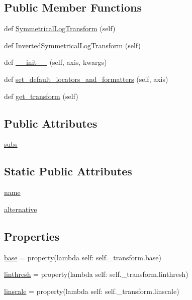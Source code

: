 \subsection*{Public Member Functions}
\begin{DoxyCompactItemize}
\item 
def \hyperlink{classmatplotlib_1_1scale_1_1SymmetricalLogScale_afa44ada0aae6492ca54a109f1097f671}{Symmetrical\+Log\+Transform} (self)
\item 
def \hyperlink{classmatplotlib_1_1scale_1_1SymmetricalLogScale_a5fdfaee038d2ec9296b96859548d03b4}{Inverted\+Symmetrical\+Log\+Transform} (self)
\item 
def \hyperlink{classmatplotlib_1_1scale_1_1SymmetricalLogScale_ae6113677e06d8b69276f1ca89d837b42}{\+\_\+\+\_\+init\+\_\+\+\_\+} (self, axis, kwargs)
\item 
def \hyperlink{classmatplotlib_1_1scale_1_1SymmetricalLogScale_aa6739f407d8e9147c94fcb43a613bba4}{set\+\_\+default\+\_\+locators\+\_\+and\+\_\+formatters} (self, axis)
\item 
def \hyperlink{classmatplotlib_1_1scale_1_1SymmetricalLogScale_ab3f3ccb4ce913cc50d9818ff90bde49d}{get\+\_\+transform} (self)
\end{DoxyCompactItemize}
\subsection*{Public Attributes}
\begin{DoxyCompactItemize}
\item 
\hyperlink{classmatplotlib_1_1scale_1_1SymmetricalLogScale_aebf71a90f042b7902d7d1578bfb49d68}{subs}
\end{DoxyCompactItemize}
\subsection*{Static Public Attributes}
\begin{DoxyCompactItemize}
\item 
\hyperlink{classmatplotlib_1_1scale_1_1SymmetricalLogScale_a1712ae25d3ffd40364937e777da47926}{name}
\item 
\hyperlink{classmatplotlib_1_1scale_1_1SymmetricalLogScale_a0a6e605c5c2d549a3b1d007f808116be}{alternative}
\end{DoxyCompactItemize}
\subsection*{Properties}
\begin{DoxyCompactItemize}
\item 
\hyperlink{classmatplotlib_1_1scale_1_1SymmetricalLogScale_affa0ca844dd982816e664e310bd052f6}{base} = property(lambda self\+: self.\+\_\+transform.\+base)
\item 
\hyperlink{classmatplotlib_1_1scale_1_1SymmetricalLogScale_a203a6a9996c15b76071d997846b829c5}{linthresh} = property(lambda self\+: self.\+\_\+transform.\+linthresh)
\item 
\hyperlink{classmatplotlib_1_1scale_1_1SymmetricalLogScale_a3471458646cebb0d3062afec6c0d7a8c}{linscale} = property(lambda self\+: self.\+\_\+transform.\+linscale)
\end{DoxyCompactItemize}


